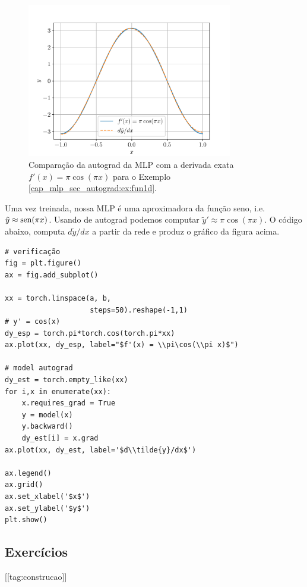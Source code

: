 \begin{ex}
  \begin{figure}[H]
    \centering
    \includegraphics[width=0.8\textwidth]{./cap_mlp/dados/fig_autograd_fun1d/fig}
    \caption{Comparação da autograd da MLP com a derivada exata $f'(x)=\pi\cos(\pi x)$ para o Exemplo \ref{cap_mlp_sec_autograd:ex:fun1d}.}
    \label{cap_mlp_sec_autograd:fig:fun1d}
  \end{figure}

  Uma vez treinada, nossa MLP é uma aproximadora da função seno, i.e. $\tilde{y} \approx \operatorname{sen}(\pi x)$. Usando de autograd podemos computar $\tilde{y}' \approx \pi\cos(\pi x)$. O código abaixo, computa $d\tilde{y}/dx$ a partir da rede e produz o gráfico da figura acima.

\begin{lstlisting}
# verificação
fig = plt.figure()
ax = fig.add_subplot()

xx = torch.linspace(a, b,
                    steps=50).reshape(-1,1)
# y' = cos(x)
dy_esp = torch.pi*torch.cos(torch.pi*xx)
ax.plot(xx, dy_esp, label="$f'(x) = \\pi\cos(\\pi x)$")

# model autograd
dy_est = torch.empty_like(xx)
for i,x in enumerate(xx):
    x.requires_grad = True
    y = model(x)
    y.backward()
    dy_est[i] = x.grad
ax.plot(xx, dy_est, label='$d\\tilde{y}/dx$')

ax.legend()
ax.grid()
ax.set_xlabel('$x$')
ax.set_ylabel('$y$')
plt.show()
\end{lstlisting}
\end{ex}

\subsection{Exercícios}
[[tag:construcao]]
